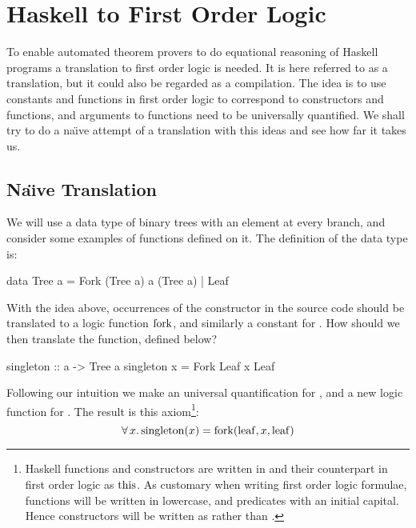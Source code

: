 \chapter{Haskell to First Order Logic}
\label{ch:translation}

To enable automated theorem provers to do equational reasoning of
Haskell programs a translation to first order logic is needed. It is
here referred to as a translation, but it could also be regarded as a
compilation. The idea is to use constants and functions in first order
logic to correspond to constructors and functions, and arguments to
functions need to be universally quantified. We shall try to do a
na\"{\i}ve attempt of a translation with this ideas and see how far it
takes us.

\section{Na\"{\i}ve Translation}
\label{sec:treetrans}

We will use a data type of binary trees with an element at every
branch, and consider some examples of functions defined on it. The
definition of the data type is:

\begin{code}
data Tree a = Fork (Tree a) a (Tree a) | Leaf
\end{code}

\noindent
With the idea above, occurrences of the  constructor in the
source code should be translated to a logic function $\mathrm{fork}$, and
similarly a constant for . How should we then translate the
 function, defined below?

\begin{code}
singleton :: a -> Tree a
singleton x = Fork Leaf x Leaf
\end{code}

\noindent
Following our intuition we make an universal quantification for
, and a new logic function for . The result is
this axiom\footnote{Haskell functions and constructors are written in
   and their counterpart in first order logic as
  $\mathrm{this}$. As customary when writing first order logic formulae,
  functions will be written in lowercase, and predicates with an
  initial capital. Hence constructors will be written as 
  rather than . }:
\begin{equation*}
\forall \, x . \, \mathrm{singleton}(x) = \mathrm{fork}(\mathrm{leaf},x,\mathrm{leaf})
\end{equation*}

